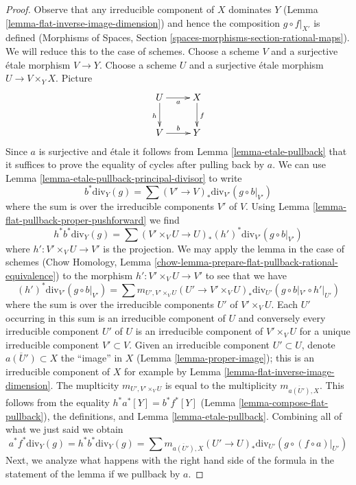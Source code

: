 \documentclass{stacks-project}
\theoremstyle{plain}
\theoremstyle{definition}
\theoremstyle{remark}
\numberwithin{equation}{subsection}
\begin{document}
\begin{proof}
Observe that any irreducible component of $X$ dominates $Y$
(Lemma \ref{lemma-flat-inverse-image-dimension})
and hence the composition $g \circ f|_{X'}$ is defined
(Morphisms of Spaces, Section \ref{spaces-morphisms-section-rational-maps}).
We will reduce this to the case of schemes. Choose a scheme $V$ and a
surjective \'etale morphism $V \to Y$. Choose a scheme $U$ and a surjective
\'etale morphism $U \to V \times_Y X$. Picture
$$
\xymatrix{
U \ar[r]_a \ar[d]_h & X \ar[d]^f \\
V \ar[r]^b & Y
}
$$
Since $a$ is surjective and \'etale it follows from
Lemma \ref{lemma-etale-pullback} that it suffices to prove the
equality of cycles after pulling back by $a$.
We can use Lemma \ref{lemma-etale-pullback-principal-divisor} to write
$$
b^*\text{div}_Y(g) = \sum (V' \to V)_*\text{div}_{V'}(g \circ b|_{V'})
$$
where the sum is over the irreducible components $V'$ of $V$.
Using Lemma \ref{lemma-flat-pullback-proper-pushforward} we find
$$
h^*b^*\text{div}_Y(g) =
\sum (V' \times_V U \to U)_*(h')^*\text{div}_{V'}(g \circ b|_{V'})
$$
where $h' : V' \times_V U \to V'$ is the projection.
We may apply the lemma in the case of schemes
(Chow Homology, Lemma
\ref{chow-lemma-prepare-flat-pullback-rational-equivalence})
to the morphism $h' : V' \times_V U \to V'$ to see that we have
$$
(h')^*\text{div}_{V'}(g \circ b|_{V'}) =
\sum
m_{U', V' \times_V U}
(U' \to V' \times_V U)_*\text{div}_{U'}(g \circ b|_{V'} \circ h'|_{U'})
$$
where the sum is over the irreducible components $U'$ of $V' \times_V U$.
Each $U'$ occurring in this sum is an irreducible component of $U$
and conversely every irreducible component $U'$ of $U$ is an
irreducible component of $V' \times_V U$
for a unique irreducible component $V' \subset V$.
Given an irreducible component $U' \subset U$,
denote $\overline{a(U')} \subset X$ the ``image'' in $X$
(Lemma \ref{lemma-proper-image}); this
is an irreducible component of $X$ for example by
Lemma \ref{lemma-flat-inverse-image-dimension}.
The muplticity $m_{U', V' \times_V U}$ is equal to
the multiplicity $m_{\overline{a(U')}, X}$.
This follows from the equality $h^*a^*[Y] = b^*f^*[Y]$
(Lemma \ref{lemma-compose-flat-pullback}), the definitions, and
Lemma \ref{lemma-etale-pullback}.
Combining all of what we just said we obtain
$$
a^*f^*\text{div}_Y(g) =
h^*b^*\text{div}_Y(g) =
\sum m_{\overline{a(U')}, X}
(U' \to U)_*\text{div}_{U'}(g \circ (f \circ a)|_{U'})
$$
Next, we analyze what happens with the right hand side of the
formula in the statement of the lemma if we pullback by $a$.

\end{proof}
\end{document}
